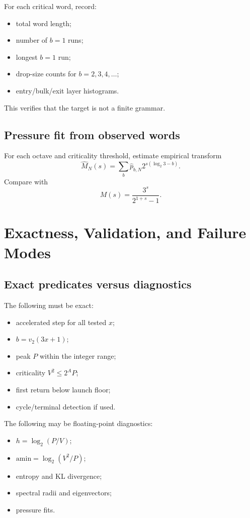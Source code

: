 \documentclass[11pt]{article}
\newcommand{\ord}{v_2}
\begin{document}
For each critical word, record:
\begin{itemize}
  \item total word length;
  \item number of $b=1$ runs;
  \item longest $b=1$ run;
  \item drop-size counts for $b=2,3,4,\ldots$;
  \item entry/bulk/exit layer histograms.
\end{itemize}
This verifies that the target is not a finite grammar.

\subsection{Pressure fit from observed words}

For each octave and criticality threshold, estimate empirical transform
\[
  \widehat M_N(s)=\sum_b\widehat p_{b,N}2^{s(\log_2 3-b)}.
\]
Compare with
\[
  M(s)=\frac{3^s}{2^{1+s}-1}.
\]

\section{Exactness, Validation, and Failure Modes}

\subsection{Exact predicates versus diagnostics}

The following must be exact:
\begin{itemize}
  \item accelerated step for all tested $x$;
  \item $b=\ord(3x+1)$;
  \item peak $P$ within the integer range;
  \item criticality $V^2\le2^AP$;
  \item first return below launch floor;
  \item cycle/terminal detection if used.
\end{itemize}

The following may be floating-point diagnostics:
\begin{itemize}
  \item $h=\log_2(P/V)$;
  \item $\mathrm{amin}=\log_2(V^2/P)$;
  \item entropy and KL divergence;
  \item spectral radii and eigenvectors;
  \item pressure fits.
\end{itemize}
\end{document}
